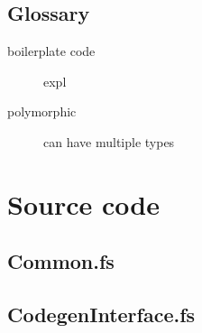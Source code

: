 \documentclass[10pt,a4paper]{article}
\begin{document}
\pagestyle{empty} 


\newpage

\setcounter{secnumdepth}{2} 
\setcounter{tocdepth}{2}


\setcounter{page}{1}
\pagestyle{plain}

\begin{multicols}{2}
\tableofcontents
\columnbreak




















\printbibliography
\end{multicols}
\newpage

\setcounter{section}{0}
\renewcommand\thesection{\Alph{section}}



\begin{multicols*}{2}
\section{Glossary}
\begin{description}
    \item[boilerplate code] expl
    \item[polymorphic] can have multiple types
\end{description}
\end{multicols*}
\newpage


\section{Source code}
\subsection{Common.fs} 

\subsection{CodegenInterface.fs} 

\end{document}
